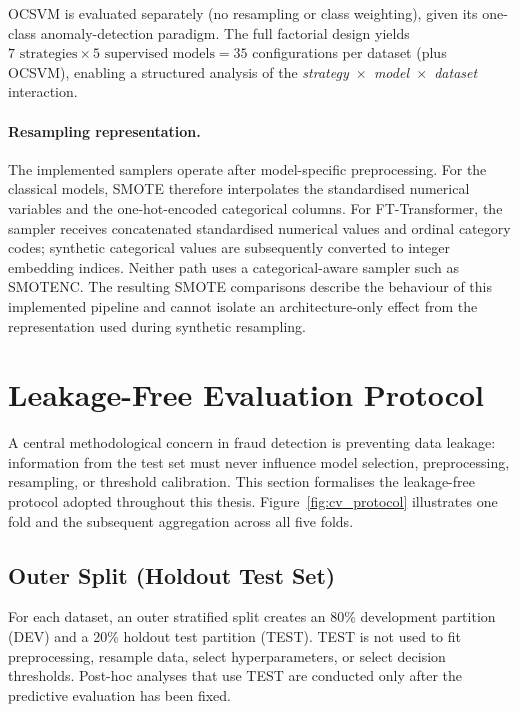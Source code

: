 OCSVM is evaluated separately (no resampling or class weighting), given its one-class anomaly-detection paradigm. The full factorial design yields $7 \text{ strategies} \times 5 \text{ supervised models} = 35$ configurations per dataset (plus OCSVM), enabling a structured analysis of the \emph{strategy~$\times$~model~$\times$~dataset} interaction.

\paragraph{Resampling representation.}
The implemented samplers operate after model-specific preprocessing. For the classical models, SMOTE therefore interpolates the standardised numerical variables and the one-hot-encoded categorical columns. For FT-Transformer, the sampler receives concatenated standardised numerical values and ordinal category codes; synthetic categorical values are subsequently converted to integer embedding indices. Neither path uses a categorical-aware sampler such as SMOTENC. The resulting SMOTE comparisons describe the behaviour of this implemented pipeline and cannot isolate an architecture-only effect from the representation used during synthetic resampling.

\section{Leakage-Free Evaluation Protocol}
\label{sec:protocol}

A central methodological concern in fraud detection is preventing data leakage: information from the test set must never influence model selection, preprocessing, resampling, or threshold calibration. This section formalises the leakage-free protocol adopted throughout this thesis. Figure~\ref{fig:cv_protocol} illustrates one fold and the subsequent aggregation across all five folds.

\subsection{Outer Split (Holdout Test Set)}
For each dataset, an outer stratified split creates an 80\% development partition (DEV) and a 20\% holdout test partition (TEST). TEST is not used to fit preprocessing, resample data, select hyperparameters, or select decision thresholds. Post-hoc analyses that use TEST are conducted only after the predictive evaluation has been fixed.

